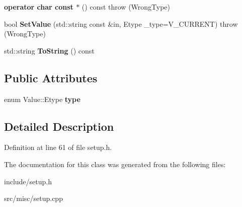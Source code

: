 \begin{DoxyCompactItemize}
\item 
\hypertarget{classValue_a34c3d3e97da4667b1ac6932b3a16fb92}{{\bfseries operator char const $\ast$} () const   throw (\-Wrong\-Type)}\label{classValue_a34c3d3e97da4667b1ac6932b3a16fb92}

\item 
\hypertarget{classValue_a7c785d7517533757bf9b3f7a15cc4e6a}{bool {\bfseries Set\-Value} (std\-::string const \&in, Etype \-\_\-type=V\-\_\-\-C\-U\-R\-R\-E\-N\-T)  throw (\-Wrong\-Type)}\label{classValue_a7c785d7517533757bf9b3f7a15cc4e6a}

\item 
\hypertarget{classValue_a31428e493a421f64254f84cf5fe114f1}{std\-::string {\bfseries To\-String} () const }\label{classValue_a31428e493a421f64254f84cf5fe114f1}

\end{DoxyCompactItemize}
\subsection*{Public Attributes}
\begin{DoxyCompactItemize}
\item 
\hypertarget{classValue_aa8611755fd5d52ca0e16f5cd8caed48f}{enum Value\-::\-Etype {\bfseries type}}\label{classValue_aa8611755fd5d52ca0e16f5cd8caed48f}

\end{DoxyCompactItemize}


\subsection{Detailed Description}


Definition at line 61 of file setup.\-h.



The documentation for this class was generated from the following files\-:\begin{DoxyCompactItemize}
\item 
include/setup.\-h\item 
src/misc/setup.\-cpp\end{DoxyCompactItemize}
